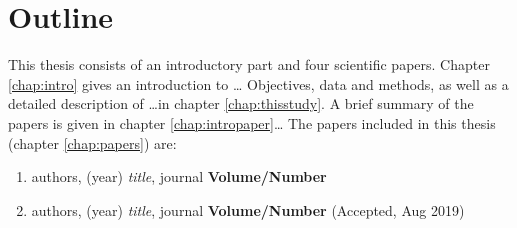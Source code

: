 \chapter{Outline}

This thesis consists of an introductory part and four scientific papers. 
Chapter \ref{chap:intro} gives an introduction to \ldots
Objectives, data and methods, as well as a detailed description of \ldots in chapter \ref{chap:thisstudy}. 
A brief summary of the papers is given in chapter \ref{chap:intropaper}\ldots
The papers included in this thesis (chapter \ref{chap:papers}) are:

\begin{enumerate}
\item authors, (year) \textit{title}, journal \textbf{Volume/Number} 

\item authors, (year) \textit{title}, journal \textbf{Volume/Number} (Accepted, Aug 2019)

\end{enumerate}
